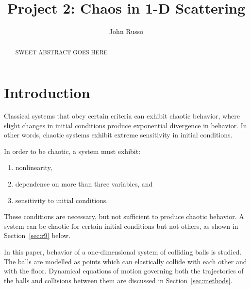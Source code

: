 \documentclass[pra,twocolumn,showpacs,amsmath,amssymb, aps, 10pt]{revtex4-1}
\begin{document}
\title{Project 2: Chaos in 1-D Scattering}


\author{John Russo}

\begin{abstract}
SWEET ABSTRACT GOES HERE
\end{abstract}



\maketitle

\section{Introduction} \label{sec:intro}

Classical systems that obey certain criteria can exhibit chaotic behavior, where
slight changes in initial conditions produce exponential divergence in behavior.
In other words, chaotic systems exhibit extreme sensitivity in initial
conditions. \cite{taylor}

In order to be chaotic, a system must exhibit:
\begin{enumerate}
  \item nonlinearity, \label{nonlinearity}
  \item dependence on more than three variables, and \label{dependence}
  \item sensitivity to initial conditions. \label{sensitivity}
\end{enumerate}

These conditions are necessary, but not sufficient to produce chaotic behavior.
A system can be chaotic for certain initial conditions but not others, as shown
in Section~\ref{sec:r9} below.

In this paper, behavior of a one-dimensional system of colliding balls is studied.
The balls are modelled as points which can elastically collide with each other
and with the floor. Dynamical equations of motion governing both the trajectories
of the balls and collisions between them are discussed
in Section~\ref{sec:methods}.
\end{document}

